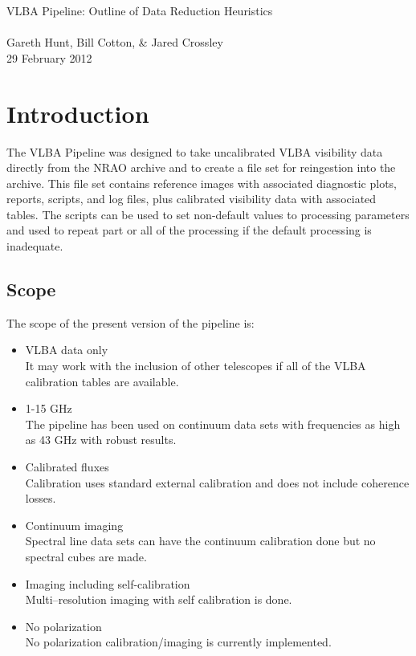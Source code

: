 \documentclass[11pt]{article}
\begin{document}
{
\begin{center}
{\Large VLBA Pipeline: Outline of Data Reduction Heuristics} \\
~ \\
Gareth Hunt, Bill Cotton, \& Jared Crossley \\
29 February 2012
\end{center}}

\section{Introduction}

The VLBA Pipeline was designed to take uncalibrated VLBA visibility data
directly from the NRAO archive and to create a file set for
reingestion into the archive.  
This file set contains reference images with associated diagnostic
plots, reports, scripts, and log files, plus calibrated visibility data
with associated tables.
The scripts can be used to set non-default values to processing
parameters and used to repeat part or all of the processing if the
default processing is inadequate.


\subsection{Scope}

The scope of the present version of the pipeline is:

\begin{itemize}
\item VLBA data only\\
It may work with the inclusion of other telescopes if all of the VLBA
calibration tables are available.
\item 1-15 GHz\\
The pipeline has been used on continuum data sets with frequencies as
high as 43 GHz with robust results.
\item Calibrated fluxes\\
Calibration uses standard external calibration and does not include
coherence losses.
\item Continuum imaging\\
Spectral line data sets can have the continuum calibration done but
no spectral cubes are made.
\item Imaging including self-calibration\\
Multi--resolution imaging with self calibration is done.
\item No polarization \\
No polarization calibration/imaging is currently implemented.
\end{itemize}
\end{document}
